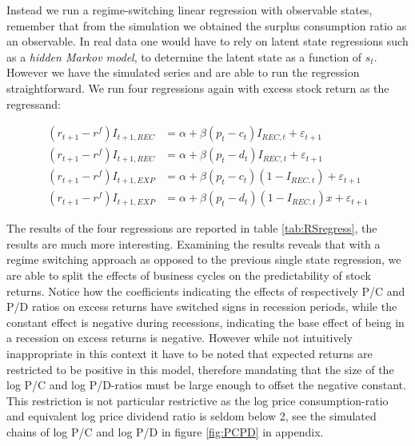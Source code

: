 



Instead we run a regime-switching linear regression with observable states, remember that from the simulation we obtained the surplus consumption ratio as an observable. In real data one would have to rely on latent state regressions such as a \textit{hidden Markov model}, to determine the latent state as a function of $s_t$.\\
However we have the simulated series and are able to run the regression straightforward. We run four regressions again with excess stock return as the regressand:

\begin{align*}
    \left(r_{t+1} - r^{f}\right) I_{t+1,REC} &=  \alpha + \beta \left( p_t - c_t \right) I_{REC,t} + \varepsilon_{t+1}\\
    \left(r_{t+1} - r^{f}\right)I_{t+1,REC} &=  \alpha + \beta \left( p_t - d_t \right) I_{REC,t} + \varepsilon_{t+1}\\
    \left(r_{t+1} - r^{f}\right)I_{t+1,EXP} &=  \alpha + \beta \left( p_t - c_t \right) \left( 1- I_{REC,t}\right)  + \varepsilon_{t+1}\\
    \left(r_{t+1} - r^{f}\right)I_{t+1,EXP} &=  \alpha + \beta \left( p_t - d_t \right) \left( 1- I_{REC,t}\right) x+ \varepsilon_{t+1}
\end{align*}

The results of the four regressions are reported in table \ref{tab:RSregress}, the results are much more interesting. Examining the results reveals that with a regime switching approach as opposed to the previous single state regression, we are able to split the effects of business cycles on the predictability of stock returns. Notice how the coefficients indicating the effects of respectively P/C and P/D ratios on excess returns have switched signs in recession periods, while the constant effect is negative during recessions, indicating the base effect of being in a recession on excess returns is negative. However while not intuitively inappropriate in this context it have to be noted that expected returns are restricted to be positive in this model, therefore mandating that the size of the log P/C and log P/D-ratios must be large enough to offset the negative constant. This restriction is not particular restrictive as the log price consumption-ratio and equivalent log price dividend ratio is seldom below 2, see the simulated chains of log P/C and log P/D in figure \ref{fig:PCPD} in appendix.\\

